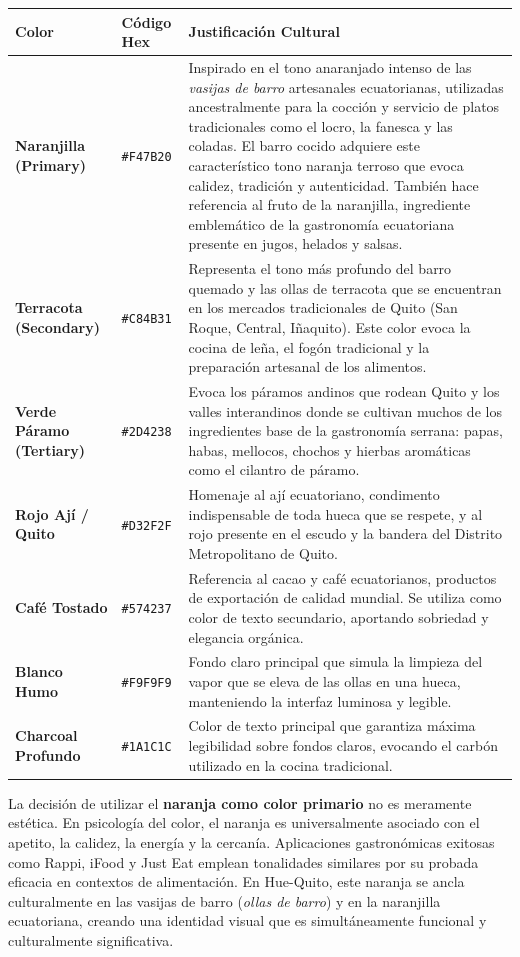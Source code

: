 \documentclass[11pt, a4paper, oneside]{report}
\begin{document}
\begin{longtable}{>{\bfseries}p{3.5cm} p{3cm} p{7cm}}
\toprule
\textbf{Color} & \textbf{Código Hex} & \textbf{Justificación Cultural} \\
\midrule
\endfirsthead
Naranjilla (Primary) & \texttt{\#F47B20} & Inspirado en el tono anaranjado intenso de las \textit{vasijas de barro} artesanales ecuatorianas, utilizadas ancestralmente para la cocción y servicio de platos tradicionales como el locro, la fanesca y las coladas. El barro cocido adquiere este característico tono naranja terroso que evoca calidez, tradición y autenticidad. También hace referencia al fruto de la naranjilla, ingrediente emblemático de la gastronomía ecuatoriana presente en jugos, helados y salsas. \\
\addlinespace
Terracota (Secondary) & \texttt{\#C84B31} & Representa el tono más profundo del barro quemado y las ollas de terracota que se encuentran en los mercados tradicionales de Quito (San Roque, Central, Iñaquito). Este color evoca la cocina de leña, el fogón tradicional y la preparación artesanal de los alimentos. \\
\addlinespace
Verde Páramo (Tertiary) & \texttt{\#2D4238} & Evoca los páramos andinos que rodean Quito y los valles interandinos donde se cultivan muchos de los ingredientes base de la gastronomía serrana: papas, habas, mellocos, chochos y hierbas aromáticas como el cilantro de páramo. \\
\addlinespace
Rojo Ají / Quito & \texttt{\#D32F2F} & Homenaje al ají ecuatoriano, condimento indispensable de toda hueca que se respete, y al rojo presente en el escudo y la bandera del Distrito Metropolitano de Quito. \\
\addlinespace
Café Tostado & \texttt{\#574237} & Referencia al cacao y café ecuatorianos, productos de exportación de calidad mundial. Se utiliza como color de texto secundario, aportando sobriedad y elegancia orgánica. \\
\addlinespace
Blanco Humo & \texttt{\#F9F9F9} & Fondo claro principal que simula la limpieza del vapor que se eleva de las ollas en una hueca, manteniendo la interfaz luminosa y legible. \\
\addlinespace
Charcoal Profundo & \texttt{\#1A1C1C} & Color de texto principal que garantiza máxima legibilidad sobre fondos claros, evocando el carbón utilizado en la cocina tradicional. \\
\bottomrule
\end{longtable}

\begin{decisionbox}
  La decisión de utilizar el \textbf{naranja como color primario} no es meramente estética. En psicología del color, el naranja es universalmente asociado con el apetito, la calidez, la energía y la cercanía. Aplicaciones gastronómicas exitosas como Rappi, iFood y Just Eat emplean tonalidades similares por su probada eficacia en contextos de alimentación. En Hue-Quito, este naranja se ancla culturalmente en las vasijas de barro (\textit{ollas de barro}) y en la naranjilla ecuatoriana, creando una identidad visual que es simultáneamente funcional y culturalmente significativa.
\end{decisionbox}
\end{document}
